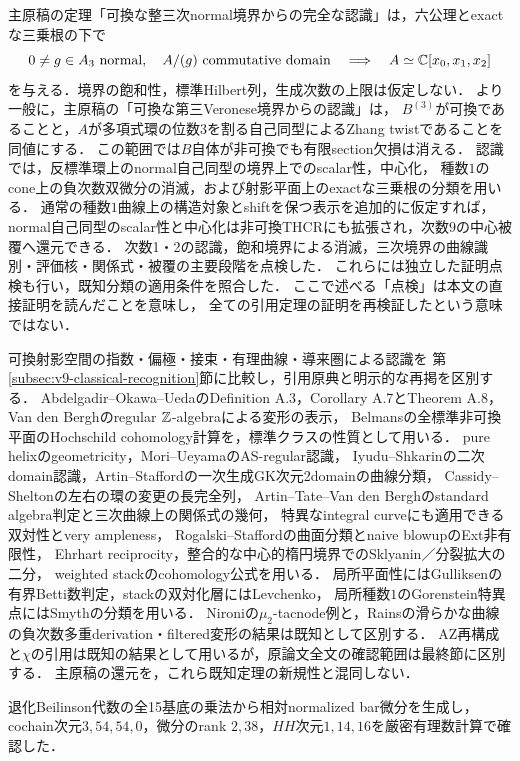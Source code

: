 \documentclass[11pt,a4paper]{ltjsarticle}
\begin{document}
\begin{description}[style=nextline]
主原稿の定理「可換な整三次normal境界からの完全な認識」は，六公理とexactな三乗根の下で
\[
 0\ne g\in A_3\ \text{normal},\quad A/(g)\ \text{commutative domain}
 \quad\Longrightarrow\quad A\simeq\C[x_0,x_1,x_2]
\]
を与える．境界の飽和性，標準Hilbert列，生成次数の上限は仮定しない．
より一般に，主原稿の「可換な第三Veronese境界からの認識」は，
$B^{(3)}$が可換であることと，$A$が多項式環の位数$3$を割る自己同型によるZhang twistであることを同値にする．
この範囲では$B$自体が非可換でも有限section欠損は消える．
認識では，反標準環上のnormal自己同型の境界上でのscalar性，中心化，
種数$1$のcone上の負次数双微分の消滅，および射影平面上のexactな三乗根の分類を用いる．
通常の種数$1$曲線上の構造対象とshiftを保つ表示を追加的に仮定すれば，
normal自己同型のscalar性と中心化は非可換THCRにも拡張され，次数$9$の中心被覆へ還元できる．
次数1・2の認識，飽和境界による消滅，三次境界の曲線識別・評価核・関係式・被覆の主要段階を点検した．
これらには独立した証明点検も行い，既知分類の適用条件を照合した．
ここで述べる「点検」は本文の直接証明を読んだことを意味し，
全ての引用定理の証明を再検証したという意味ではない．
\item[既知定理への適用を点検した部分]
可換射影空間の指数・偏極・接束・有理曲線・導来圏による認識を
第\ref{subsec:v9-classical-recognition}節に比較し，引用原典と明示的な再掲を区別する．
Abdelgadir--Okawa--UedaのDefinition A.3，Corollary A.7とTheorem A.8，
Van den Berghのregular $\mathbb Z$-algebraによる変形の表示，
Belmansの全標準非可換平面のHochschild cohomology計算を，標準クラスの性質として用いる．
pure helixのgeometricity，Mori--UeyamaのAS-regular認識，
Iyudu--Shkarinの二次domain認識，Artin--Staffordの一次生成GK次元2domainの曲線分類，
Cassidy--Sheltonの左右の環の変更の長完全列，
Artin--Tate--Van den Berghのstandard algebra判定と三次曲線上の関係式の幾何，
特異なintegral curveにも適用できる双対性とvery ampleness，
Rogalski--Staffordの曲面分類とnaive blowupのExt非有限性，
Ehrhart reciprocity，整合的な中心的楕円境界でのSklyanin／分裂拡大の二分，
weighted stackのcohomology公式を用いる．
局所平面性にはGulliksenの有界Betti数判定，stackの双対化層にはLevchenko，
局所種数$1$のGorenstein特異点にはSmythの分類を用いる．
Nironiの$\mu_2$-tacnode例と，Rainsの滑らかな曲線の負次数多重derivation・filtered変形の結果は既知として区別する．
AZ再構成と$\chi$の引用は既知の結果として用いるが，原論文全文の確認範囲は最終節に区別する．
主原稿の還元を，これら既知定理の新規性と混同しない．
\item[計算で確認した部分]
退化Beilinson代数の全15基底の乗法から相対normalized bar微分を生成し，
cochain次元$3,54,54,0$，微分のrank $2,38$，$HH$次元$1,14,16$を厳密有理数計算で確認した．

\end{description}
\end{document}

